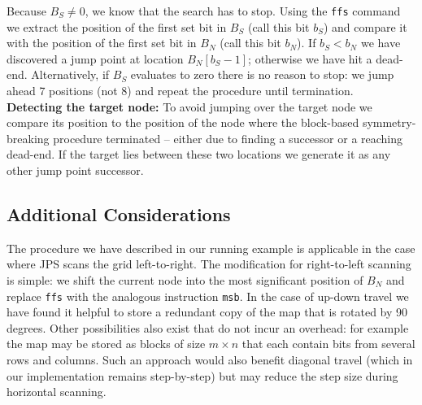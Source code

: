 Because $B_S \neq 0$, we know that the search has to stop.  Using the
\texttt{ffs} command we extract the position of the first set bit in $B_S$
(call this bit $b_S$) and compare it with the position of the first set bit
in $B_N$ (call this bit $b_N$).  If $b_S < b_N$ we have discovered a jump point at
location $B_N[b_S-1]$; otherwise we have hit a dead-end.  Alternatively, if
$B_S$ evaluates to zero there is no reason to stop: we jump ahead 7 positions
(not 8) and repeat the procedure until termination.
\\ \noindent
\textbf{Detecting the target node:}
To avoid jumping over the target node we compare its position to the position
of the node where the block-based symmetry-breaking procedure terminated --
either due to finding a successor or a reaching dead-end. If the target lies
between these two locations we generate it as any other jump point successor.

\subsection*{Additional Considerations}
The procedure we have described in our running example is applicable in the case
where JPS scans the grid left-to-right. The modification for right-to-left
scanning is simple: we shift the current node into the most significant position
of $B_N$ and replace \texttt{ffs} with the analogous instruction \texttt{msb}.  In the case
of up-down travel we have found it helpful to store a redundant copy of the
map that is rotated by 90 degrees. Other possibilities also exist that do not
incur an overhead: for example the map may be stored as blocks of size $m
\times n$ that each contain bits from several rows and columns. Such an
approach would also benefit diagonal travel (which in our implementation
remains step-by-step) but may reduce the step size during horizontal scanning.
%


